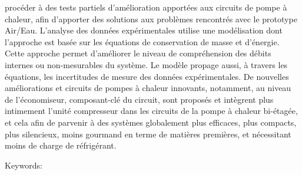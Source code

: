 procéder à des tests partiels d'amélioration apportées aux circuits de
pompe à chaleur, afin d'apporter des solutions aux problèmes
rencontrés avec le prototype Air/Eau. L'analyse des données
expérimentales utilise une modélisation dont l'approche est basée sur
les équations de conservation de masse et d'énergie. Cette approche
permet d'améliorer le niveau de compréhension des débits internes ou
non-mesurables du système. Le modèle propage aussi, à travers les
équations, les incertitudes de mesure des données expérimentales. De
nouvelles améliorations et circuits de pompes à chaleur innovants,
notamment, au niveau de l'économiseur, composant-clé du circuit, sont
proposés et intègrent plus intimement l'unité compresseur dans les
circuits de la pompe à chaleur bi-étagée, et cela afin de parvenir à
des systèmes globalement plus efficaces, plus compacts, plus
silencieux, moins gourmand en terme de matières premières, et
nécessitant moins de charge de réfrigérant.

\vspace{10mm}

Keywords:~\varfrkeywords
